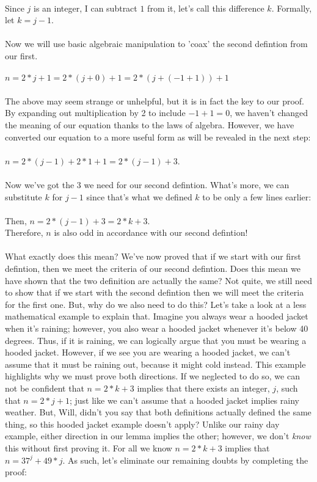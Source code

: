 \documentclass[a4paper,12pt]{article}
\begin{document}
\\
Since $j$ is an integer, I can subtract $1$ from it, let's call this difference $k$. Formally, let $k = j - 1$.\\
\\
Now we will use basic algebraic manipulation to 'coax' the second defintion from our first.\\
\\
$n = 2*j + 1 = 2*(j + 0) + 1 = 2*(j + (-1 + 1)) + 1$\\
\\
The above may seem strange or unhelpful, but it is in fact the key to our proof. By expanding out multiplication by 2 to include $-1 + 1 = 0$, we haven't changed the meaning of our equation thanks to the laws of algebra. However, we have converted our equation to a more useful form as will be revealed in the next step:\\
\\
$n = 2*(j - 1) + 2*1 + 1 = 2*(j - 1) + 3$.\\
\\
Now we've got the $3$ we need for our second defintion. What's more, we can substitute $k$ for $j - 1$ since that's what we defined $k$ to be only a few lines earlier:\\
\\
Then, $n = 2*(j - 1) + 3 = 2*k + 3$.\\
Therefore, $n$ is also odd in accordance with our second defintion!\\
\\
What exactly does this mean? We've now proved that if we start with our first defintion, then we meet the criteria of our second defintion. Does this mean we have shown that the two definition are actually the same? Not quite, we still need to show that if we start with the second defintion then we will meet the criteria for the first one. But, why do we also need to do this? Let's take a look at a less mathematical example to explain that. Imagine you always wear a hooded jacket when it's raining; however, you also wear a hooded jacket whenever it's below 40 degrees. Thus, if it is raining, we can logically argue that you must be wearing a hooded jacket. However, if we see you are wearing a hooded jacket, we can't assume that it must be raining out, because it might cold instead. This example highlights why we must prove both directions. If we neglected to do so, we can not be confident that $n = 2*k + 3$ implies that there exists an integer, $j$, such that $n = 2*j + 1$; just like we can't assume that a hooded jacket implies rainy weather. But, Will, didn't you say that both definitions actually defined the same thing, so this hooded jacket example doesn't apply? Unlike our rainy day example, either direction in our lemma implies the other; however, we don't \textit{know} this without first proving it. For all we know $n = 2*k + 3$ implies that $n = 37^j + 49*j$. As such, let's eliminate our remaining doubts by completing the proof:\\
\end{document}
